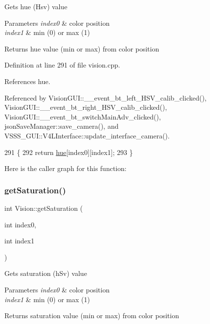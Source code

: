 Gets hue (Hsv) value 
\begin{DoxyParams}{Parameters}
{\em index0} & color position \\
\hline
{\em index1} & min (0) or max (1) \\
\hline
\end{DoxyParams}
\begin{DoxyReturn}{Returns}
hue value (min or max) from color position 
\end{DoxyReturn}


Definition at line 291 of file vision.\+cpp.



References hue.



Referenced by Vision\+G\+U\+I\+::\+\_\+\+\_\+event\+\_\+bt\+\_\+left\+\_\+\+H\+S\+V\+\_\+calib\+\_\+clicked(), Vision\+G\+U\+I\+::\+\_\+\+\_\+event\+\_\+bt\+\_\+right\+\_\+\+H\+S\+V\+\_\+calib\+\_\+clicked(), Vision\+G\+U\+I\+::\+\_\+\+\_\+event\+\_\+bt\+\_\+switch\+Main\+Adv\+\_\+clicked(), json\+Save\+Manager\+::save\+\_\+camera(), and V\+S\+S\+S\+\_\+\+G\+U\+I\+::\+V4\+L\+Interface\+::update\+\_\+interface\+\_\+camera().


\begin{DoxyCode}
291                                          \{
292     \textcolor{keywordflow}{return} \hyperlink{class_vision_a557114ed93889df7c09fe7add7a2fa1f}{hue}[index0][index1];
293 \}
\end{DoxyCode}
Here is the caller graph for this function\+:
\mbox{\label{class_vision_a023ff4cc4ee3a88125fd2a3c60d1b529}} 
\subsubsection{\texorpdfstring{get\+Saturation()}{getSaturation()}}
{\footnotesize\ttfamily int Vision\+::get\+Saturation (\begin{DoxyParamCaption}\item[{int}]{index0,  }\item[{int}]{index1 }\end{DoxyParamCaption})}

Gets saturation (h\+Sv) value 
\begin{DoxyParams}{Parameters}
{\em index0} & color position \\
\hline
{\em index1} & min (0) or max (1) \\
\hline
\end{DoxyParams}
\begin{DoxyReturn}{Returns}
saturation value (min or max) from color position 
\end{DoxyReturn}


